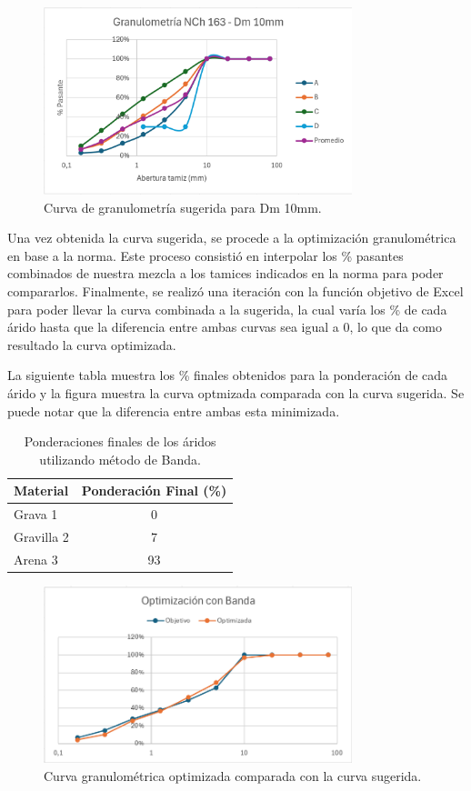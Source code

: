 \begin{figure}[H]
    \centering
    \includegraphics[width=0.8\textwidth]{GRAFICOS/NCh163.png}
    \caption{Curva de granulometría sugerida para Dm 10mm.}
\end{figure}

Una vez obtenida la curva sugerida, se procede a la optimización granulométrica en base a la norma. Este proceso consistió en interpolar los \% pasantes combinados de nuestra mezcla a los tamices indicados en la norma para poder compararlos. Finalmente, se realizó una iteración con la función objetivo de Excel para poder llevar la curva combinada a la sugerida, la cual varía los \% de cada árido hasta que la diferencia entre ambas curvas sea igual a 0, lo que da como resultado la curva optimizada.

La siguiente tabla muestra los \% finales obtenidos para la ponderación de cada árido y la figura muestra la curva optmizada comparada con la curva sugerida. Se puede notar que la diferencia entre ambas esta minimizada.

\begin{table}[H]
\centering
\caption{Ponderaciones finales de los áridos utilizando método de Banda.}
\begin{tabular}{|l|c|}
\hline
\textbf{Material} & \textbf{Ponderación Final (\%)} \\ \hline
Grava 1     & 0 \\ \hline
Gravilla 2  & 7 \\ \hline
Arena 3     & 93 \\ \hline
\end{tabular}
\end{table}

\begin{figure}[H]
    \centering
    \includegraphics[width=0.8\textwidth]{GRAFICOS/opti_banda.png}
    \caption{Curva granulométrica optimizada comparada con la curva sugerida.}
\end{figure}

